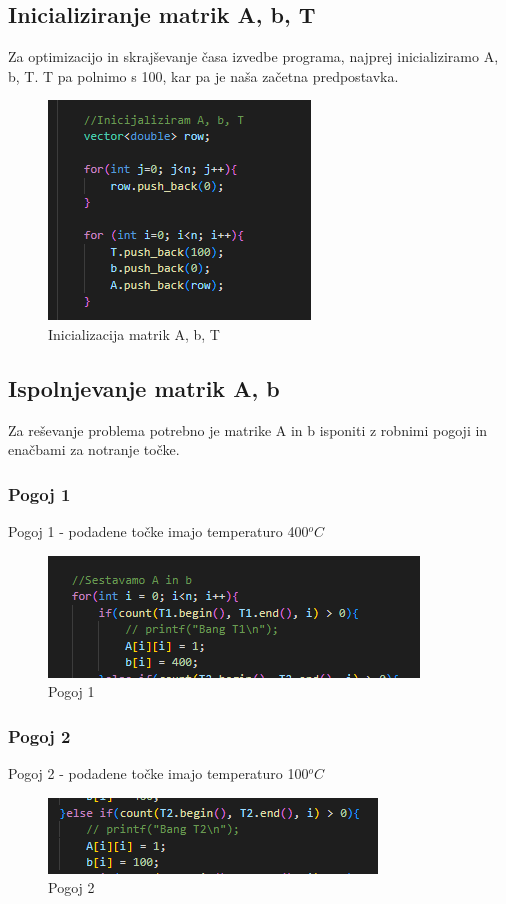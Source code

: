 \documentclass[12pt]{article}
\begin{document}
\subsection{Inicializiranje matrik A, b, T}
    Za optimizacijo in skrajševanje časa izvedbe programa, najprej inicializiramo A, b, T. T pa polnimo s 100, kar pa je naša začetna predpostavka.
        \begin{figure}[ht]
        \centering
        \includegraphics[width=0.5\linewidth]{inicijalizacijaAbT.png}
        \renewcommand*\figurename{Slika}
        \caption{Inicializacija matrik A, b, T}
        \label{Slika:4}
    \end{figure}
\FloatBarrier
\subsection{Ispolnjevanje matrik A, b}
    Za reševanje problema potrebno je matrike A in b isponiti z robnimi pogoji in enačbami za notranje točke.
    \FloatBarrier
    \subsubsection{Pogoj 1}
    Pogoj 1 - podadene točke imajo temperaturo 400$^oC$
    \begin{figure}[ht]
        \centering
        \includegraphics[width=0.5\linewidth]{pogoj1.png}
        \renewcommand*\figurename{Slika}
        \caption{Pogoj 1}
        \label{Slika:5}
    \end{figure}
    \FloatBarrier
    \subsubsection{Pogoj 2}
        Pogoj 2 - podadene točke imajo temperaturo 100$^oC$
            \begin{figure}[ht]
                \centering
                \includegraphics[width=0.5\linewidth]{pogoj2.png}
                \renewcommand*\figurename{Slika}
                \caption{Pogoj 2}
                \label{Slika:6}
            \end{figure}
    \FloatBarrier
\end{document}
